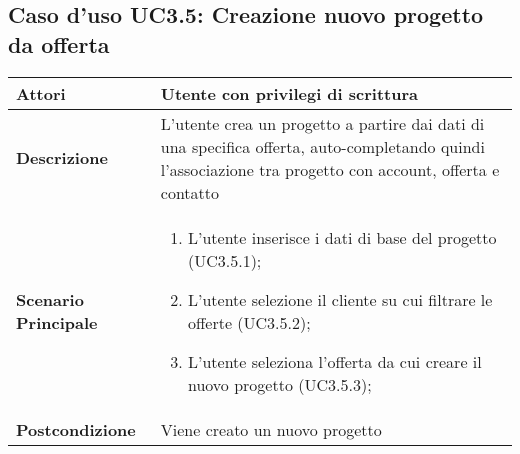 	\subsection{Caso d'uso UC3.5: Creazione nuovo progetto da offerta}
	\begin{longtable}{ | p{2.7cm} | p{12cm} |}
		\hline \textbf{Attori} & Utente con privilegi di scrittura\\ 
		\hline \textbf{Descrizione} & L'utente crea un progetto a partire dai dati di una specifica offerta, auto-completando quindi l'associazione tra progetto con account, offerta e contatto\\ 
		\hline \textbf{Scenario Principale} & \begin{enumerate}
			\item L’utente inserisce i dati di base del progetto  (UC3.5.1);
			\item L’utente selezione il cliente su cui filtrare le offerte  (UC3.5.2);
			\item L’utente seleziona l’offerta da cui creare il nuovo progetto  (UC3.5.3);
			
		\end{enumerate}
		\\ 
		\hline \textbf{Postcondizione} & Viene creato un nuovo progetto\\ 
		\hline 
	\end{longtable}